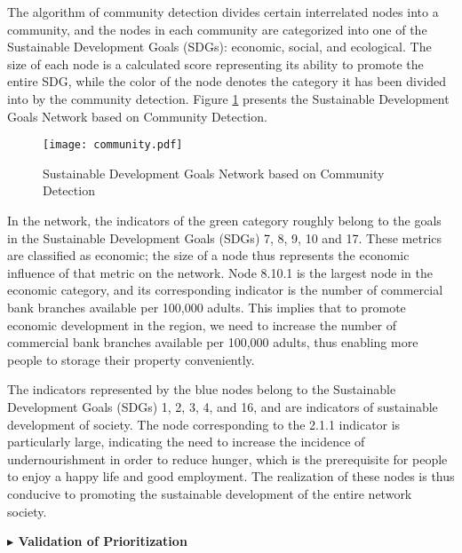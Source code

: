 \documentclass[12pt]{article}  %
\begin{document}
The algorithm of community detection divides certain interrelated nodes into a community, and the nodes in each community are categorized into one of the Sustainable Development Goals (SDGs): economic, social, and ecological. The size of each node is a calculated score representing its ability to promote the entire SDG, while the color of the node denotes the category it has been divided into by the community detection.
Figure \ref{fig:4.3} presents the Sustainable Development Goals Network based on Community Detection.

\begin{figure}[htbp]
\centering
\texttt{[image: community.pdf]}
\caption{Sustainable Development Goals Network based on Community Detection}\label{fig:4.3}
\end{figure}

In the network, the indicators of the green category roughly belong to the goals in the Sustainable Development Goals (SDGs) 7, 8, 9, 10 and 17. These metrics are classified as economic; the size of a node thus represents the economic influence of that metric on the network. Node 8.10.1 is the largest node in the economic category, and its corresponding indicator is the number of commercial bank branches available per 100,000 adults. This implies that to promote economic development in the region, we need to increase the number of commercial bank branches available per 100,000 adults, thus enabling more people to storage their property conveniently. 


The indicators represented by the blue nodes belong to the Sustainable Development Goals (SDGs) 1, 2, 3, 4, and 16, and are indicators of sustainable development of society. The node corresponding to the 2.1.1 indicator is particularly large, indicating the need to increase the incidence of undernourishment in order to reduce hunger, which is the prerequisite for people to enjoy a happy life and good employment. The realization of these nodes is thus conducive to promoting the sustainable development of the entire network society.

\vspace{0.7mm}\begin{itshape}
\textbf{$\blacktriangleright$
Validation of Prioritization 
}\end{itshape}
\end{document}
